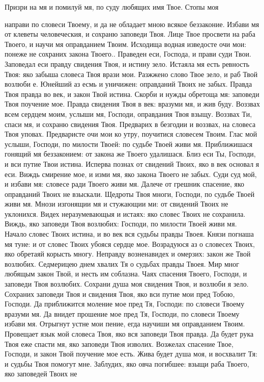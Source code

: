    Призри на мя и помилуй мя, по суду любящих имя Твое. Стопы моя

направи по словеси Твоему, и да не обладает мною всякое беззаконие. Избави
мя от клеветы человеческия, и сохраню заповеди Твоя. Лице Твое просвети
на раба Твоего, и научи мя оправданием Твоим. Исходища водная изведосте
очи мои: понеже не сохраних закона Твоего.. Праведен еси, Господа, и
прави суди Твои. Заповедал еси правду свидения Твоя, и истину зело.
Истаяла мя есть ревность Твоя: яко забыша словеса Твоя врази мои.
Разжжено слово Твое зело, и раб Твой возлюби е. Юнейший аз есмь и
уничижен: оправданий Твоих не забых. Правда Твоя правда во век, и
закон Твой истина. Скорби и нужды обретоща мя: заповеди Твоя
поучение мое. Правда свидения Твоя в век: вразуми мя, и жив буду.
Воззвах всем сердцем моим, услыши мя, Господи, оправдания Твоя
взыщу. Воззвах Ти, спаси мя, и сохраню свидения Твоя. Предварих в
безгодии и воззвах, на словеса Твоя уповах. Предваристе очи мои
ко утру, поучитися словесем Твоим. Глас мой услыши, Господи, по
милости Твоей: по судьбе Твоей живи мя. Приближишася гонящий мя
беззаконием: от закона же Твоего удалишася. Близ еси Ты, Господи, и вси
путие Твои истина. Исперва познах от свидений Твоих, яко в век
основал я еси. Виждь смирение мое, и изми мя, яко закона Твоего не
забых. Суди суд мой, и избави мя: словесе ради Твоего живи мя.
Далече от грешник спасение, яко оправданий Твоих не взыскали.
Щедроты Твоя многи, Господи, по судьбе Твоей живи мя. Мнози
изгонящии мя и стужающии ми: от свидений Твоих не уклонихся. Видех
неразумевающыя и истаях: яко словес Твоих не сохранила. Виждь,
яко заповеди Твоя возлюбих: Господи, по милости Твоей живи мя.
Начало словес Твоих истина, и во век вся судьбы правды Твоея. Князи
погнаша мя туне: и от словес Твоих убояся сердце мое. Возрадуюся аз о
словесех Твоих, яко обретаяй корысть многу. Неправду возненавидех и
омерзих: закон же Твой возлюбих. Седмерицею днем хвалих Тя о
судьбах правды Твоея. Мир мног любящым закон Твой, и несть им
соблазна. Чаях спасения Твоего, Господи, и заповеди Твоя возлюбих.
Сохрани душа моя свидения Твоя, и возлюби я зело. Сохраних заповеди
Твоя и свидения Твоя, яко вси путие мои пред Тобою, Господи. Да
приближится моление мое пред Тя, Господи: по словеси Твоему вразуми
мя. Да внидет прошение мое пред Тя, Господи, по словеси Твоему
избави мя. Отрыгнут устне мои пение, егда научиши мя оправданием
Твоим. Провещает язык мой словеса Твоя, яко вся заповеди Твоя
правда. Да будет рука Твоя еже спасти мя, яко заповеди Твоя изволих.
Возжелах спасение Твое, Господи, и закон Твой поучение мое есть.
Жива будет душа моя, и восхвалит Тя: и судьбы Твоя помогут мне.
Заблудих, яко овча погибшее: взыщи раба Твоего, яко заповедей Твоих не

